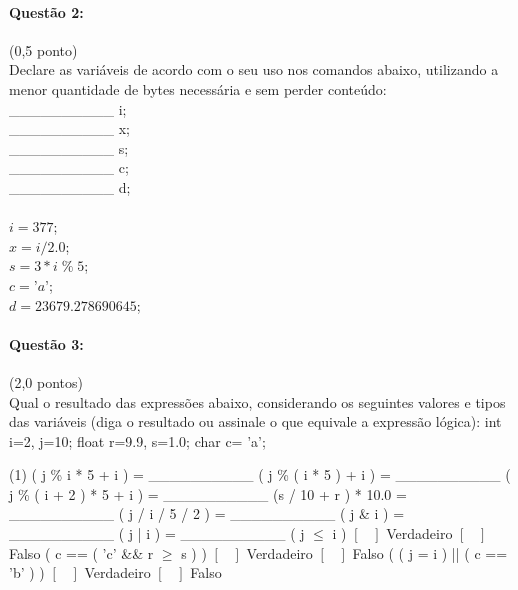 \documentclass[12pt,a4paper]{article}
\begin{document}
\paragraph{Questão 2:}(0,5 ponto)\\
Declare as variáveis de acordo com o seu uso nos comandos abaixo, utilizando a menor quantidade de bytes necessária e sem perder conteúdo:\\
\_\_\_\_\_\_\_\_\_\_ i;\\
\_\_\_\_\_\_\_\_\_\_ x;\\
\_\_\_\_\_\_\_\_\_\_ s;\\
\_\_\_\_\_\_\_\_\_\_ c;\\
\_\_\_\_\_\_\_\_\_\_ d;\\\\
$i = 377$;\\
$x = i / 2.0$;\\ 
$s = 3 * i \;\%\; 5 $;\\
$c = \text{'}a\text{'}$;\\ 
$d = 23679.278690645$;

\paragraph{Questão 3:}(2,0 pontos)\\
Qual o resultado das expressões abaixo, considerando os seguintes valores e tipos das variáveis (diga o resultado ou assinale o que equivale a expressão lógica):
int i=2, j=10;
float r=9.9, s=1.0;
char c= 'a';
\begin{tasks}(1)
\task ( j \;\%\; i * 5 + i ) = \_\_\_\_\_\_\_\_\_\_
\task ( j \;\%\; ( i * 5 ) + i ) = \_\_\_\_\_\_\_\_\_\_
\task ( j \;\%\; ( i + 2 ) * 5 + i ) = \_\_\_\_\_\_\_\_\_\_
\task (s / 10 + r ) * 10.0 = \_\_\_\_\_\_\_\_\_\_
\task ( j / i / 5 / 2 ) = \_\_\_\_\_\_\_\_\_\_
\task ( j \& i ) = \_\_\_\_\_\_\_\_\_\_
\task ( j | i ) = \_\_\_\_\_\_\_\_\_\_
\task ( j $\leq$ i ) $\left [\;\;\; \right] $ Verdadeiro      $\left [\;\;\; \right]$ Falso
\task ( c == ( 'c' \&\& r $\geq$ s ) ) $\left [\;\;\; \right] $ Verdadeiro      $\left [\;\;\; \right]$ Falso
\task ( ( j = i ) || ( c == 'b' ) ) $\left [\;\;\; \right] $ Verdadeiro     $\left [\;\;\; \right]$ Falso
\end{tasks}
\end{document}
